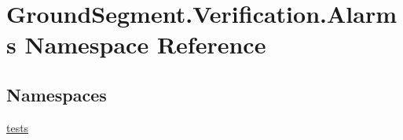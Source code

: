 \hypertarget{namespace_ground_segment_1_1_verification_1_1_alarms}{}\section{Ground\+Segment.\+Verification.\+Alarms Namespace Reference}
\label{namespace_ground_segment_1_1_verification_1_1_alarms}
\subsection*{Namespaces}
\begin{DoxyCompactItemize}
\item 
 \hyperlink{namespace_ground_segment_1_1_verification_1_1_alarms_1_1tests}{tests}
\end{DoxyCompactItemize}
